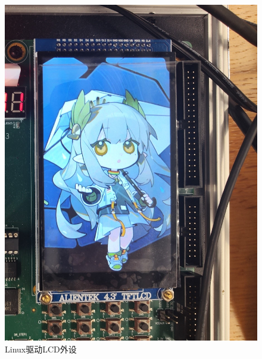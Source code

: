 \documentclass{article}
\begin{document}
\begin{figure}[htbp]
    \centering
    \begin{minipage}[b]{0.45\textwidth}
      \includegraphics[width=\textwidth]{./imgs/Lcd_show.jpg}
      \caption{Linux驱动LCD外设}
    \end{minipage}
    \hfill 
    \begin{minipage}[b]{0.45\textwidth}

\end{minipage}
\end{figure}
\end{document}
